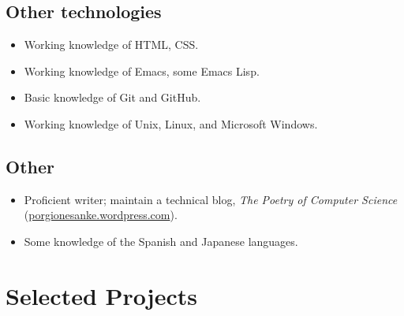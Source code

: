 \documentclass[12pt]{article}
\begin{document}
\subsection*{Other technologies}
\label{sec-3-2}

\begin{itemize}
\item Working knowledge of HTML, CSS.
\item Working knowledge of Emacs, some Emacs Lisp.
\item Basic knowledge of Git and GitHub.
\item Working knowledge of Unix, Linux, and Microsoft Windows.
\end{itemize}
\subsection*{Other}
\label{sec-3-3}

\begin{itemize}
\item Proficient writer; maintain a technical blog, \textit{The Poetry of Computer Science} (\href{http://porgionesanke.wordpress.com}{porgionesanke.wordpress.com}).
\item Some knowledge of the Spanish and Japanese languages.
\end{itemize}
\section*{Selected Projects}
\label{sec-4}
\end{document}
